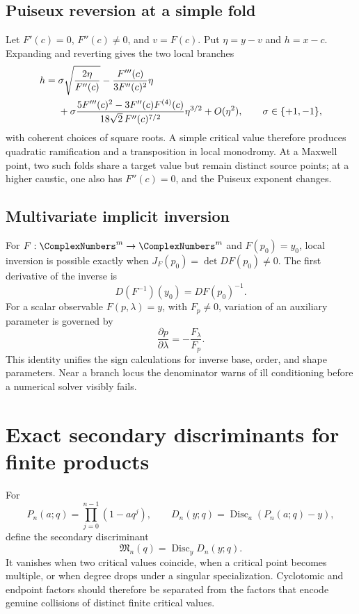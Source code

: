 \documentclass[11pt,oneside]{article}
\theoremstyle{definition}
\theoremstyle{remark}
\theoremstyle{plain}
\theoremstyle{definition}
\theoremstyle{remark}
\newcommand{\Disc}{\operatorname{Disc}}
\numberwithin{equation}{section}
\numberwithin{figure}{section}
\numberwithin{table}{section}
\let\reporttopsection\section
\let\reportsubsection\subsection
\let\reportsubsubsection\subsubsection
\let\chapter\reporttopsection
\let\section\reportsubsection
\let\subsection\reportsubsubsection
\begin{document}
\section{Puiseux reversion at a simple fold}
Let \(F'(c)=0\), \(F''(c)\ne0\), and \(v=F(c)\).  Put
\(\eta=y-v\) and \(h=x-c\).  Expanding and reverting gives the two local
branches
\begin{align}
 h={}&\sigma\sqrt{\frac{2\eta}{F''(c)}}
 -\frac{F'''(c)}{3F''(c)^2}\eta\notag\\
 &+\sigma\frac{5F'''(c)^2-3F''(c)F^{(4)}(c)}
 {18\sqrt{2}\,F''(c)^{7/2}}\eta^{3/2}
 +O(\eta^2),
 \qquad \sigma\in\{+1,-1\},
 \label{eq:fold-puiseux-explicit}
\end{align}
with coherent choices of square roots.  A simple critical value therefore
produces quadratic ramification and a transposition in local monodromy.  At a
Maxwell point, two such folds share a target value but remain distinct source
points; at a higher caustic, one also has \(F''(c)=0\), and the Puiseux
exponent changes.

\section{Multivariate implicit inversion}
For \(F:\ComplexNumbers^m\to\ComplexNumbers^m\) and \(F(p_0)=y_0\), local inversion is possible
exactly when \(J_F(p_0)=\det DF(p_0)\ne0\).  The first derivative of the
inverse is
\[
 D(F^{-1})(y_0)=DF(p_0)^{-1}.
\]
For a scalar observable \(F(p,\lambda)=y\), with \(F_p\ne0\), variation of
an auxiliary parameter is governed by
\begin{equation}
 \frac{\partial p}{\partial\lambda}
 =-\frac{F_\lambda}{F_p}.
 \label{eq:parameter-inverse-sensitivity}
\end{equation}
This identity unifies the sign calculations for inverse base, order, and
shape parameters.  Near a branch locus the denominator warns of ill
conditioning before a numerical solver visibly fails.

\chapter{Exact secondary discriminants for finite products}
\label{app:secondary-discriminants}

For
\[
 P_n(a;q)=\prod_{j=0}^{n-1}(1-aq^j),
 \qquad
 D_n(y;q)=\Disc_a(P_n(a;q)-y),
\]
define the secondary discriminant
\[
 \mathfrak M_n(q)=\Disc_y D_n(y;q).
\]
It vanishes when two critical values coincide, when a critical point becomes
multiple, or when degree drops under a singular specialization.  Cyclotomic
and endpoint factors should therefore be separated from the factors that
encode genuine collisions of distinct finite critical values.
\end{document}
